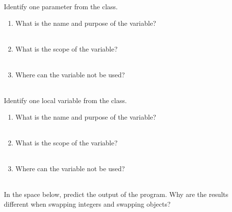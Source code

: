 \Q Identify one parameter from the  class.
\begin{enumerate}
\item What is the name and purpose of the variable?
\\  \\[-2em]

\item What is the scope of the variable?
\\  \\[-2em]

\item Where can the variable not be used?
\\  \\[-2em]
\end{enumerate}


\Q Identify one local variable from the  class.
\begin{enumerate}
\item What is the name and purpose of the variable?
\\  \\[-2em]

\item What is the scope of the variable?
\\  \\[-2em]

\item Where can the variable not be used?
\\  \\[-2em]
\end{enumerate}


\Q \label{predict}
In the space below, predict the output of the  program.
Why are the results different when swapping integers and swapping objects?

